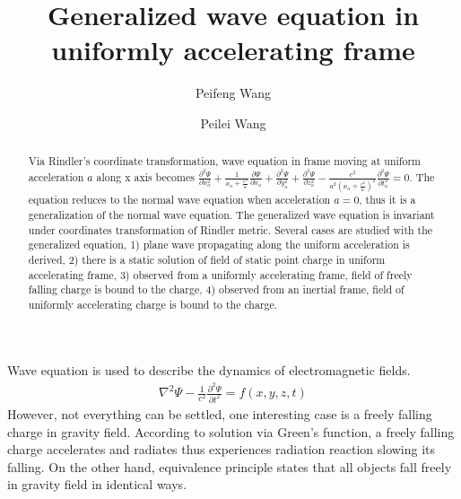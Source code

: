 \documentclass[prd,showpacs,preprint]{revtex4-1}
\begin{document}
\title{Generalized wave equation in uniformly accelerating frame}
\author{Peifeng Wang}
\author{Peilei Wang}
\address{Guanghua Road 1\#, 34-1-3-5, Yanta District, Xi'an, Shaanxi, P. R. China 710075}
\address{Mijiaqiao 34-1-3-5, Xi'an, Shaanxi, P. R. China 710075}
\begin{abstract}
Via Rindler's coordinate transformation, wave equation in frame moving at uniform acceleration $a$ along x axis becomes $\frac{\partial^2 \Psi}{\partial x_a^2} + \frac{1}{x_a+\frac{c^2}{a}}\frac{\partial \Psi}{\partial x_a} + \frac{\partial^2 \Psi}{\partial y_a^2} + \frac{\partial^2 \Psi}{\partial z_a^2} - \frac{c^2}{a^2(x_a+\frac{c^2}{a})^2}\frac{\partial^2 \Psi}{\partial t_a^2}=0$. The equation reduces to the normal wave equation when acceleration $a=0$, thus it is a generalization of the normal wave equation. The generalized wave equation is invariant under coordinates transformation of Rindler metric. Several cases are studied with the generalized equation, 1) plane wave propagating along the uniform acceleration is derived, 2) there is a static solution of field of static point charge in uniform accelerating frame, 3) observed from a uniformly accelerating frame, field of freely falling charge is bound to the charge, 4) observed from an inertial frame, field of uniformly accelerating charge is bound to the charge.
\end{abstract}
\maketitle

Wave equation is used to describe the dynamics of electromagnetic fields\cite{Jackson}.
\begin{eqnarray}
\nabla^2 \Psi-\frac{1}{c^2}\frac{\partial^2 \Psi}{\partial t^2}=f(x,y,z,t)
\label{eqn:Wave}
\end{eqnarray}
However, not everything can be settled, one interesting case is a freely falling charge in gravity field. According to solution via Green's function, a freely falling charge accelerates and radiates thus experiences radiation reaction slowing its falling. On the other hand, equivalence principle states that all objects fall freely in gravity field in identical ways.
\end{document}
